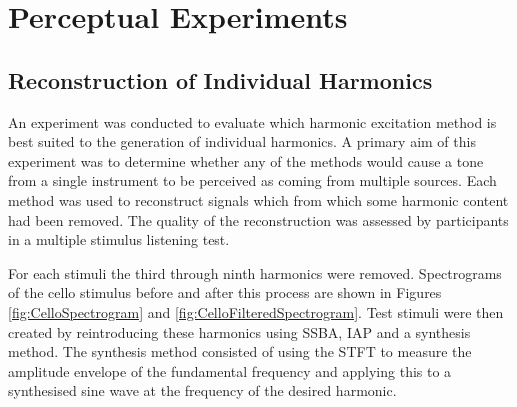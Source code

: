 \chapter{Perceptual Experiments}
\label{chap:PerceptualExperiments}

\section{Reconstruction of Individual Harmonics}
\label{sec:PerceptualExperiments-Reconstruction}
	An experiment was conducted to evaluate which harmonic excitation method is best suited to the generation of
	individual harmonics. A primary aim of this experiment was to determine whether any of the methods would cause a
	tone from a single instrument to be perceived as coming from multiple sources. Each method was used to reconstruct
	signals which from which some harmonic content had been removed. The quality of the reconstruction was assessed by
	participants in a multiple stimulus listening test. 


	For each stimuli the third through ninth harmonics were removed. Spectrograms of the cello stimulus before and after
	this process are shown in Figures \ref{fig:CelloSpectrogram} and \ref{fig:CelloFilteredSpectrogram}.  Test stimuli
	were then created by reintroducing these harmonics using SSBA, IAP and a synthesis method.  The synthesis method
	consisted of using the STFT to measure the amplitude envelope of the fundamental frequency and applying this to a
	synthesised sine wave at the frequency of the desired harmonic. 

